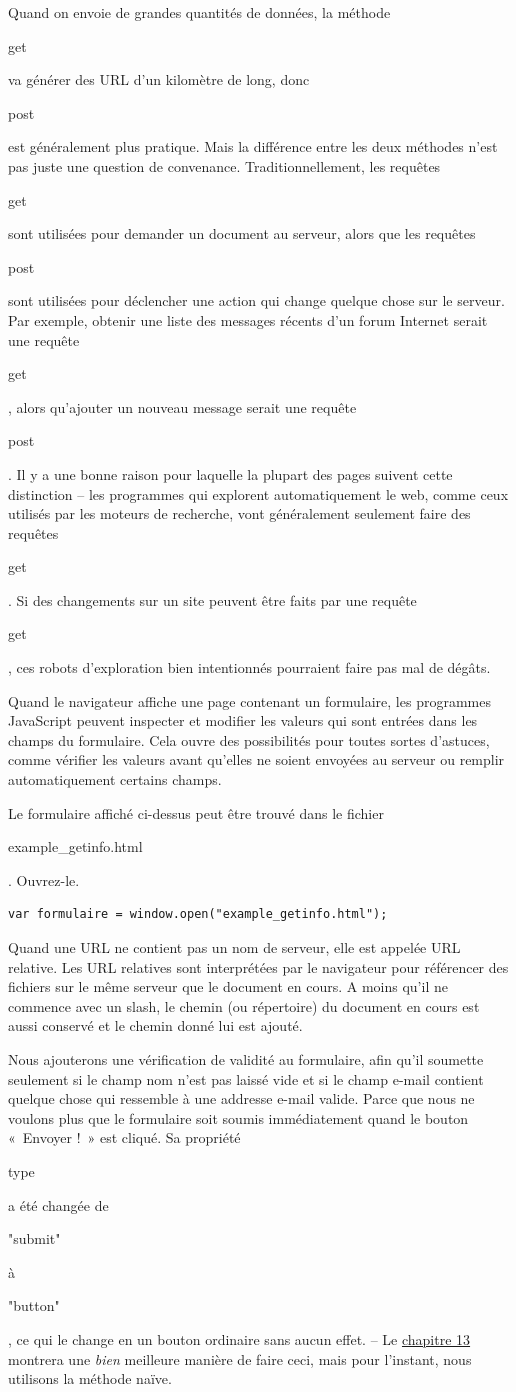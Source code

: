 \documentclass{FramateX}
\renewcommand{\texttt}[1]{\begin{sffamily}{#1}\end{sffamily}}
\begin{document}
Quand on envoie de grandes quantités de données, la méthode \texttt{get}
va générer des URL d'un kilomètre de long, donc \texttt{post} est
généralement plus pratique. Mais la différence entre les deux méthodes
n'est pas juste une question de convenance. Traditionnellement, les
requêtes \texttt{get} sont utilisées pour demander un document au
serveur, alors que les requêtes \texttt{post} sont utilisées pour
déclencher une action qui change quelque chose sur le serveur. Par
exemple, obtenir une liste des messages récents d'un forum Internet
serait une requête \texttt{get}, alors qu'ajouter un nouveau message
serait une requête \texttt{post}. Il y a une bonne raison pour laquelle
la plupart des pages suivent cette distinction -- les programmes qui
explorent automatiquement le web, comme ceux utilisés par les moteurs de
recherche, vont généralement seulement faire des requêtes \texttt{get}.
Si des changements sur un site peuvent être faits par une requête
\texttt{get}, ces robots d'exploration bien intentionnés pourraient
faire pas mal de dégâts.

\begin{center}\end{center}

Quand le navigateur affiche une page contenant un formulaire, les
programmes JavaScript peuvent inspecter et modifier les valeurs qui sont
entrées dans les champs du formulaire. Cela ouvre des possibilités pour
toutes sortes d'astuces, comme vérifier les valeurs avant qu'elles ne
soient envoyées au serveur ou remplir automatiquement certains champs.

Le formulaire affiché ci-dessus peut être trouvé dans le fichier
\texttt{example\_getinfo.html}. Ouvrez-le.

\begin{lstlisting}
var formulaire = window.open("example_getinfo.html");
\end{lstlisting}
Quand une URL ne contient pas un nom de serveur, elle est appelée URL
relative. Les URL relatives sont interprétées par le navigateur pour
référencer des fichiers sur le même serveur que le document en cours. A
moins qu'il ne commence avec un slash, le chemin (ou répertoire) du
document en cours est aussi conservé et le chemin donné lui est ajouté.

Nous ajouterons une vérification de validité au formulaire, afin qu'il
soumette seulement si le champ nom n'est pas laissé vide et si le champ
e-mail contient quelque chose qui ressemble à une addresse e-mail
valide. Parce que nous ne voulons plus que le formulaire soit soumis
immédiatement quand le bouton «~Envoyer !~» est cliqué. Sa propriété
\texttt{type} a été changée de \texttt{"submit"} à \texttt{"button"}, ce
qui le change en un bouton ordinaire sans aucun effet. -- Le
\href{chapter13.html}{chapitre 13} montrera une \emph{bien} meilleure
manière de faire ceci, mais pour l'instant, nous utilisons la méthode
naïve.
\end{document}
